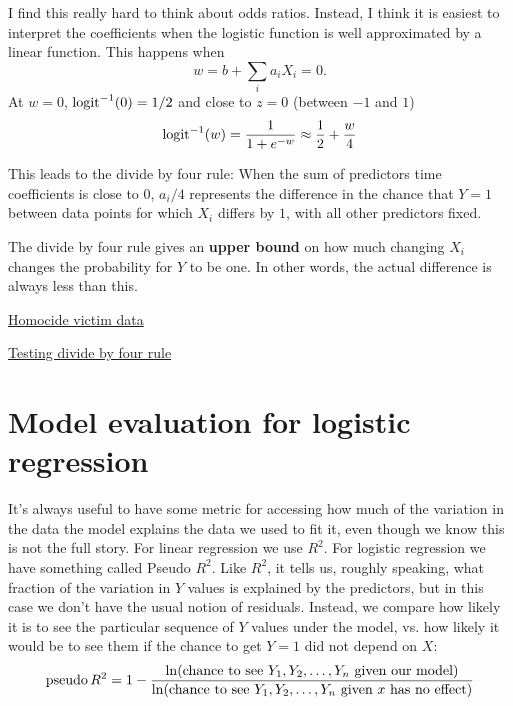 I find this really hard to think about odds ratios.  Instead, I think it is easiest to interpret the coefficients when the logistic function is well approximated by a linear function.  This happens when 
\begin{equation}
w= b + \sum_i a_iX_i =0.
\end{equation}
 At $w=0$, ${\rm logit}^{-1}(0) =1/2$ and  close to $z=0$ (between $-1$ and $1$)
\begin{equation}
{\rm logit}^{-1}(w) = \frac{1}{1+e^{-w}} \approx \frac{1}{2} + \frac{w}{4}
\end{equation}


 This leads to the {\dfn divide by four rule}: When the sum of predictors time coefficients is close to $0$, $a_i/4$ represents the difference in the chance that $Y=1$ between data points for which $X_i$ differs by $1$, with all other predictors fixed.

 The divide by four rule gives an {\bf upper bound} on how much changing $X_i$ changes the probability for $Y$ to be one. In other words, the actual difference is always less than this. 
 
 
  
 \begin{example}
 \href{https://colab.research.google.com/drive/1_oMrxtIlJ-EdW1ozmlydx0A9qrA-sVKm#scrollTo=j8moyIWyuVQZ&line=3&uniqifier=1}{Homocide victim data}
 \end{example}
 
 
 \begin{exercise}
 \href{https://colab.research.google.com/drive/1_oMrxtIlJ-EdW1ozmlydx0A9qrA-sVKm#scrollTo=j8moyIWyuVQZ&line=3&uniqifier=1}{Testing divide by four rule}
 \end{exercise}
 


\section{Model evaluation for logistic regression}

It's always useful to have some metric for accessing how much of the variation in the data the model explains the data we used to fit it, even though we know this is not the full story. For linear regression we use $R^2$. For logistic regression we have something called Pseudo $R^2$. Like $R^2$, it tells us, roughly speaking, what fraction of the variation in $Y$ values is explained by the predictors, but in this case we don't have the usual notion of residuals. Instead, we compare how likely it is to see the particular sequence of $Y$ values under the model, vs. how likely it would be to see them if the chance to get $Y=1$ did not depend on $X$:
\begin{equation}
{\rm pseudo}\, R^2 = 1- \frac{\ln( \text{chance to see $Y_1,Y_2,\dots,Y_n$ given our model})}{\ln (\text{chance to see $Y_1,Y_2,\dots,Y_n$ given $x$ has no effect})}
\end{equation}

